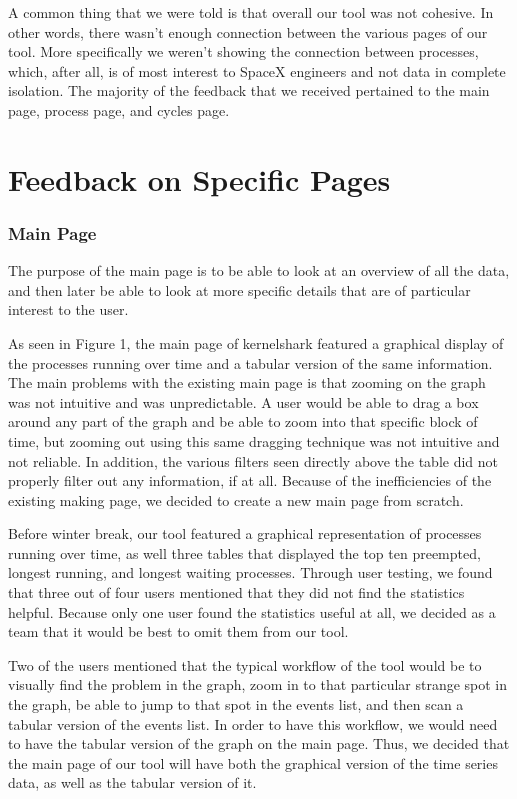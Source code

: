 \documentclass{hmcclinic}
\begin{document}
A common thing that we were told is that overall our tool was not cohesive. In other words, there wasn't enough connection between the various pages of our tool. More specifically we weren't showing the connection between processes, which, after all, is of most interest to SpaceX engineers and not data in complete isolation. The majority of the feedback that we received pertained to the main page, process page, and cycles page.

\section{Feedback on Specific Pages} %

\subsubsection{Main Page}
The purpose of the main page is to be able to look at an overview of all the data, and then later be able to look at more specific details that are of particular interest to the user.

As seen in Figure 1, the main page of kernelshark featured a graphical display of the processes running over time and a tabular version of the same information. The main problems with the existing main page is that zooming on the graph was not intuitive and was unpredictable. A user would be able to drag a box around any part of the graph and be able to zoom into that specific block of time, but zooming out using this same dragging technique was not intuitive and not reliable. In addition, the various filters seen directly above the table did not properly filter out any information, if at all. Because of the inefficiencies of the existing making page, we decided to create a new main page from scratch. 

Before winter break, our tool featured a graphical representation of processes running over time, as well three tables that displayed the top ten preempted, longest running, and longest waiting processes. Through user testing, we found that three out of four users mentioned that they did not find the statistics helpful. Because only one user found the statistics useful at all, we decided as a team that it would be best to omit them from our tool.

Two of the users mentioned that the typical workflow of the tool would be to visually find the problem in the graph, zoom in to that particular strange spot in the graph, be able to jump to that spot in the events list, and then scan a tabular version of the events list. In order to have this workflow, we would need to have the tabular version of the graph on the main page. Thus, we decided that the main page of our tool will have both the graphical version of the time series data, as well as the tabular version of it.
\end{document}
